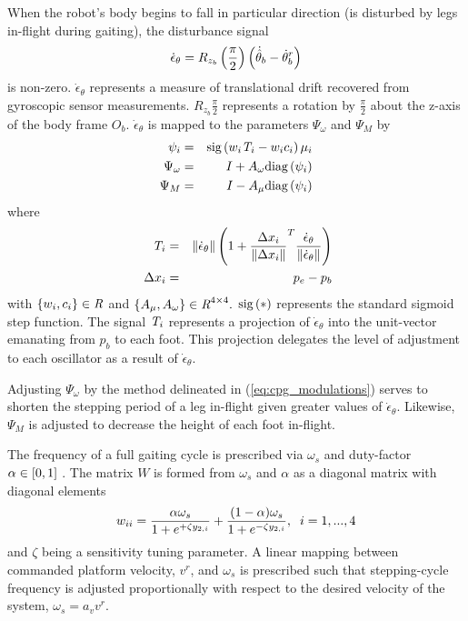			When the robot's body begins to fall in particular direction (\IE is disturbed by legs in-flight during gaiting), the disturbance signal 
		\begin{equation}
			\dot{\epsilon}_{\theta} = {R}_{z_{b}}\left(\frac{\pi}{2}\right)\left(\dot{\hat{\theta}}_{b} - \dot{\theta}_{b}^{r}\right)
		\end{equation}
			is non-zero. $\dot{\epsilon}_{\theta}$ represents a measure of translational drift recovered from gyroscopic sensor measurements. ${R}_{z_{b}}{\frac{\pi}{2}}$ represents a rotation by $\frac{\pi}{2}$ about the z-axis of the body frame $O_{b}$. $\dot{\epsilon}_{\theta}$ is mapped to the parameters $\Psi_{\omega}$ and $\Psi_{M}$ by
				\begin{eqnarray}
					\psi_{i} 			&=& \text{sig}\left(  w_{i} \emph{T}_{i} - w_{i} c_{i} \right) {\mu}_{i} 	\nonumber\\
					\Psi_{\omega} 		&=& I + A_{\omega}\text{diag}\left( \psi_{i} \right) 						\nonumber\\
					\Psi_{M}			&=& I - A_{\mu} \text{diag}\left(  \psi_{i} \right) 
					\label{eq::cpg_modulations}
				\end{eqnarray}
			where
				\begin{eqnarray}
					\emph{T}_{i} 		&=& \left\lVert \dot{\epsilon}_{\theta} \right\rVert \left(1 + \frac{\Delta x_{i}}{\left\lVert\Delta x_{i}\right\rVert}^T  \frac{ \dot{\epsilon}_{\theta}  }{\left\lVert \dot{\epsilon}_{\theta}  \right\rVert} \right)	\nonumber\\\
					\Delta x_{i}		&=& {p}_{e} - {p}_{b}
				\end{eqnarray}
			with $\{w_{i}, c_{i}\} \in\emph{R}^{}$ and $\{A_{\mu}, A_{\omega}\}   \in\emph{R}^{4\times4}.$ $\text{sig}\left(*\right)$ represents the standard
			sigmoid step function. The signal $\emph{T}_{i}$ represents a projection of $\dot{\epsilon}_{\theta}$ into the unit-vector emanating from ${p}_{b}$ to each \Ith foot. This projection delegates the level of adjustment to each \Ith oscillator as a result of $\dot{\epsilon}_{\theta}$. 		

			Adjusting $\Psi_{\omega}$ by the method delineated in (\ref{eq:cpg_modulations}) serves to shorten the stepping period of a leg in-flight given greater values of $\dot{\epsilon}_{\theta}$. Likewise, $\Psi_{M}$ is adjusted to decrease the height of each foot in-flight. 

			The frequency of a full gaiting cycle is prescribed via $\omega_{s}$ and duty-factor $\alpha \in \left[0,1\right]$ \cite{Matos2010}. The matrix $W$ is formed from  $\omega_{s}$ and $\alpha$ as a diagonal matrix with diagonal elements 
				\begin{equation}
						w_{ii} = 	{ 
								   	\frac{\alpha \omega_{s}}{	1+e^{+\zeta y_{2,i}}	}	+
									\frac{(1-	\alpha)\omega_{s}}{	1+e^{-\zeta y_{2,i}}	} 
								}, \hspace{2mm} i = 1,...,4 	
					\label{eq::CPGMatrices}
				\end{equation}
			and $\zeta$ being a sensitivity tuning parameter. A linear mapping between commanded platform velocity, $v^{r}$, and $\omega_{s}$ is prescribed such that stepping-cycle frequency is adjusted proportionally with respect to the desired velocity of the system, \IE $\omega_{s} = a_{v}v^{r}$.

